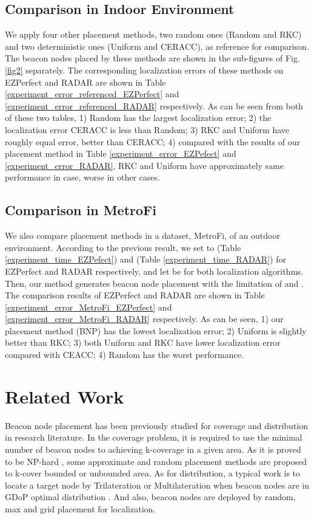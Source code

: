 \documentclass[10pt, conference, letterpaper]{IEEEtran}
\begin{document}
\subsection{Comparison in Indoor Environment}
We apply four other placement methods, two random ones (Random and RKC) and two deterministic ones (Uniform and CERACC), as reference for comparison. The beacon nodes placed by these methods are shown in the sub-figures of Fig. \ref{fig2} separately. The corresponding localization errors of these methods on EZPerfect and RADAR are shown in Table \ref{experiment_error_referenced_EZPerfect} and \ref{experiment_error_referenced_RADAR} respectively. As can be seen from both of these two tables, 1) Random has the largest localization error; 2) the localization error CERACC is less than Random; 3) RKC and Uniform have roughly equal error, better than CERACC; 4) compared with the results of our placement method in Table \ref{experiment_error_EZPefect} and \ref{experiment_error_RADAR}, RKC and Uniform have approximately same performance in  case, worse in other cases.

\subsection{Comparison in MetroFi}
We also compare placement methods in a dataset, MetroFi, of an outdoor environment. According to the previous result, we set  to  (Table \ref{experiment_time_EZPefect}) and  (Table \ref{experiment_time_RADAR}) for EZPerfect and RADAR respectively, and let  be  for both localization algorithms. Then, our method generates beacon node placement with the limitation of  and . The comparison results of EZPerfect and RADAR are shown in Table \ref{experiment_error_MetroFi_EZPerfect} and \ref{experiment_error_MetroFi_RADAR} respectively. As can be seen, 1) our placement method (BNP) has the lowest localization error; 2) Uniform is slightly better than RKC; 3) both Uniform and RKC have lower localization error compared with CEACC; 4) Random has the worst performance.

\section{Related Work} \label{related}
Beacon node placement has been previously studied for coverage and distribution in research literature. In the coverage problem, it is required to use the minimal number of beacon nodes to achieving k-coverage in a given area. As it is proved to be NP-hard \cite{CoverageNP03}, some approximate \cite{CERACC12} and random \cite{RKC07} placement methods are proposed to k-cover bounded or unbounded area. As for distribution, a typical work is to locate a target node by Trilateration or Multilateration when beacon nodes are in GDoP optimal distribution \cite{GDoP00}. And also, beacon nodes are deployed by random, max and grid placement \cite{Grid01} for localization.
\end{document}
